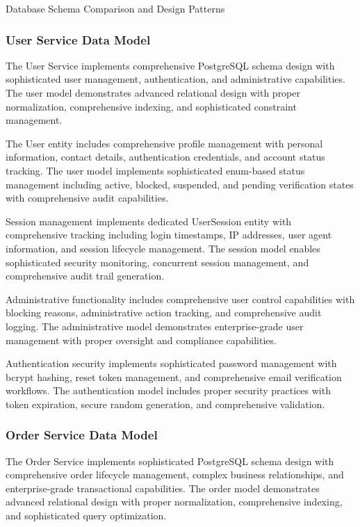 \begin{table}[H]
\centering
\caption{Database Schema Comparison and Design Patterns}
\label{tab:database-schema-comparison}
\end{table}

\subsubsection{User Service Data Model}

The User Service implements comprehensive PostgreSQL schema design with sophisticated user management, authentication, and administrative capabilities. The user model demonstrates advanced relational design with proper normalization, comprehensive indexing, and sophisticated constraint management.

The User entity includes comprehensive profile management with personal information, contact details, authentication credentials, and account status tracking. The user model implements sophisticated enum-based status management including active, blocked, suspended, and pending verification states with comprehensive audit capabilities.

Session management implements dedicated UserSession entity with comprehensive tracking including login timestamps, IP addresses, user agent information, and session lifecycle management. The session model enables sophisticated security monitoring, concurrent session management, and comprehensive audit trail generation.

Administrative functionality includes comprehensive user control capabilities with blocking reasons, administrative action tracking, and comprehensive audit logging. The administrative model demonstrates enterprise-grade user management with proper oversight and compliance capabilities.

Authentication security implements sophisticated password management with bcrypt hashing, reset token management, and comprehensive email verification workflows. The authentication model includes proper security practices with token expiration, secure random generation, and comprehensive validation.

\subsubsection{Order Service Data Model}

The Order Service implements sophisticated PostgreSQL schema design with comprehensive order lifecycle management, complex business relationships, and enterprise-grade transactional capabilities. The order model demonstrates advanced relational design with proper normalization, comprehensive indexing, and sophisticated query optimization.

